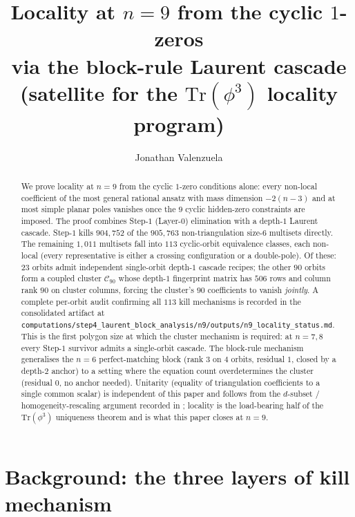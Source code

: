 \documentclass[11pt]{article}
\title{Locality at $n=9$ from the cyclic $1$-zeros\\
       \large via the block-rule Laurent cascade\\
       \small (satellite for the $\mathrm{Tr}(\phi^3)$ locality program)}
\author{Jonathan Valenzuela}
\date{}
\theoremstyle{definition}
\begin{document}
\maketitle

\begin{abstract}
We prove locality at $n=9$ from the cyclic $1$-zero conditions alone:
every non-local coefficient of the most general rational ansatz with
mass dimension $-2(n{-}3)$ and at most simple planar poles vanishes
once the $9$ cyclic hidden-zero constraints are imposed. The proof
combines Step-$1$ (Layer-$0$) elimination with a depth-$1$ Laurent
cascade. Step-$1$ kills $904{,}752$ of the $905{,}763$ non-triangulation
size-$6$ multisets directly. The remaining $1{,}011$ multisets fall
into $113$ cyclic-orbit equivalence classes, each non-local
(every representative is either a crossing configuration or a
double-pole). Of these:
$23$ orbits admit independent single-orbit depth-$1$ cascade recipes;
the other $90$ orbits form a coupled cluster $\mathcal C_{90}$ whose
depth-$1$ fingerprint matrix has $506$ rows and column rank $90$ on
cluster columns, forcing the cluster's $90$ coefficients to vanish
\emph{jointly}. A complete per-orbit audit confirming all $113$ kill
mechanisms is recorded in the consolidated artifact at
\verb|computations/step4_laurent_block_analysis/n9/outputs/n9_locality_status.md|.
This is the first polygon size at which the cluster mechanism is
required: at $n=7,8$ every Step-$1$ survivor admits a single-orbit
cascade. The block-rule mechanism generalises the $n=6$
perfect-matching block (rank $3$ on $4$ orbits, residual $1$, closed
by a depth-$2$ anchor) to a setting where the equation count
overdetermines the cluster (residual $0$, no anchor needed).
Unitarity (equality of triangulation coefficients to a single
common scalar) is independent of this paper and follows from the
$d$-subset / homogeneity-rescaling argument recorded in
\cite{notes11,notes18,subsetvan}; locality is the load-bearing half
of the $\mathrm{Tr}(\phi^3)$ uniqueness theorem and is what this
paper closes at $n=9$.
\end{abstract}

\section{Background: the three layers of kill mechanism}\label{sec:layers}
\end{document}
